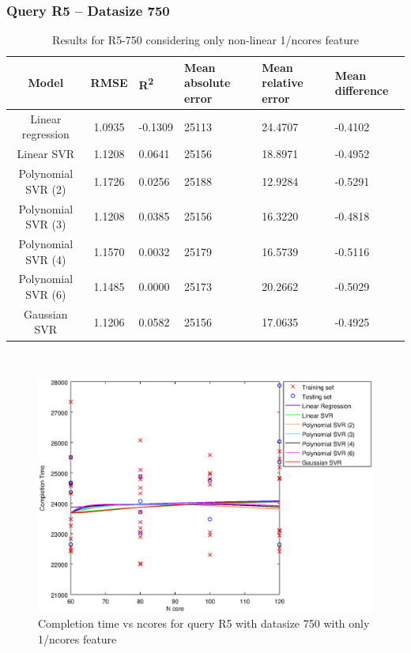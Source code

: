\documentclass[a4paper,11pt]{article}
\begin{document}
\newpage
\subsubsection{Query R5 -- Datasize 750}
\begin{table}[H]
	\centering
	\begin{adjustbox}{center}
		\begin{tabular}{c | c M{1.2cm} M{2.5cm} M{2.5cm} M{1.8cm}}
			Model & RMSE & R\textsuperscript{2} & Mean absolute error & Mean relative error & Mean difference \tabularnewline
			\hline
			Linear regression & 1.0935 & -0.1309 &  25113 & 24.4707 & -0.4102 \\
			Linear SVR & 1.1208 & 0.0641 &  25156 & 18.8971 & -0.4952 \\
			Polynomial SVR (2) & 1.1726 & 0.0256 &  25188 & 12.9284 & -0.5291 \\
			Polynomial SVR (3) & 1.1208 & 0.0385 &  25156 & 16.3220 & -0.4818 \\
			Polynomial SVR (4) & 1.1570 & 0.0032 &  25179 & 16.5739 & -0.5116 \\
			Polynomial SVR (6) & 1.1485 & 0.0000 &  25173 & 20.2662 & -0.5029 \\
			Gaussian SVR & 1.1206 & 0.0582 &  25156 & 17.0635 & -0.4925 \\
		\end{tabular}
	\end{adjustbox}
	\\
	\caption{Results for R5-750 considering only non-linear 1/ncores feature}
	\label{table_R5_prediction_all}
\end{table}

\begin {figure}[hbtp]
\centering
\includegraphics[width=\textwidth]{output/R5_750_ONLY_1_OVER_NCORES/plot_R5_750.eps}
\caption {Completion time vs ncores for query R5 with datasize 750 with only 1/ncores feature}
\end {figure}
\end{document}
